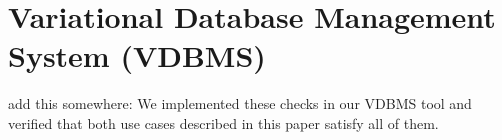 \chapter{Variational Database Management System (VDBMS)}
\label{ch:vdbms}

add this somewhere:
We implemented these checks in our VDBMS tool and verified that both use cases
described in this paper satisfy all of them. 


